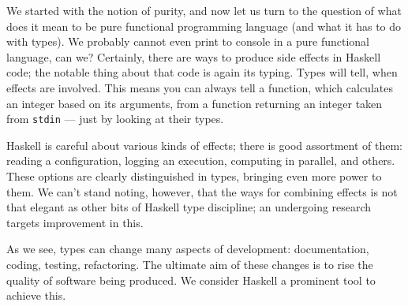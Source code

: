 \documentclass[11pt]{article}
\begin{document}
We started with the notion of purity, and now let us turn to the question of what does it mean to be pure functional programming language (and what it has to do with types). We probably cannot even print to console in a pure functional language, can we? Certainly, there are ways to produce side effects in Haskell code; the notable thing about that code is again its typing. Types will tell, when effects are involved. This means you can always tell a function, which calculates an integer based on its arguments, from a function returning an integer taken from \texttt{stdin} --- just by looking at their types.

Haskell is careful about various kinds of effects; there is good assortment of them: reading a configuration, logging an execution, computing in parallel, and others. These options are clearly distinguished in types, bringing even more power to them. We can't stand noting, however, that the ways for combining effects is not that elegant as other bits of Haskell type discipline; an undergoing research targets improvement in this.

As we see, types can change many aspects of development: documentation, coding, testing, refactoring. The ultimate aim of these changes is to rise the quality of software being produced. We consider Has\-kell a prominent tool to achieve this.
\end{document}

